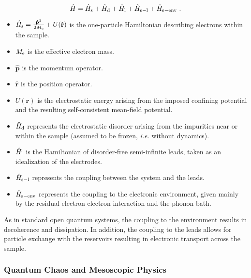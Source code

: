 \documentclass[a4paper,10pt]{article}
\newcommand{\br}{\mathbf{r}}
\newcommand{\nin}{\noindent}
\def\Me{M_{\rm e}}
\begin{document}
\begin{equation}
\hat H = \hat H_{\rm s} + \hat H_{\rm d} + \hat H_{\rm l} + 
\hat H_{\rm s-l} + \hat H_{\rm s-env} \ .
\end{equation} 
\begin{itemize}

\item $\hat H_{\rm s} = \frac{\mathbf{\hat p}^2}{2\Me} + U(\hat{\br})$ is the one-particle Hamiltonian describing electrons within the sample.

\item $\Me$ is the effective electron mass. 

\item $\hat{\mathbf{p}}$ is the momentum operator. 

\item $\hat{\mathbf{r}}$ is the position operator. 

\item $U(\br)$ is the electrostatic energy arising from the imposed confining potential and the resulting self-consistent mean-field potential. 

\item $\hat H_{\rm d}$ represents the electrostatic disorder arising from the impurities near or within the sample (assumed to be frozen, {\em i.e.} without dynamics).

\item $\hat H_{\rm l}$ is the Hamiltonian of disorder-free semi-infinite leads, taken as an idealization of the electrodes.

\item $\hat H_{\rm s-l}$ represents the coupling between the system and the leads.

\item $\hat H_{\rm s-env}$ represents the coupling to the electronic environment, given mainly by the residual electron-electron interaction and the phonon bath.   

\end{itemize}

\nin As in standard open quantum systems, the coupling to the environment results in decoherence and dissipation. In addition, the coupling to the leads allows for particle exchange with the reservoirs resulting in electronic transport across the sample.

\subsubsection{Quantum Chaos and Mesoscopic Physics}
\label{subsub:QCaMS}
\end{document}
